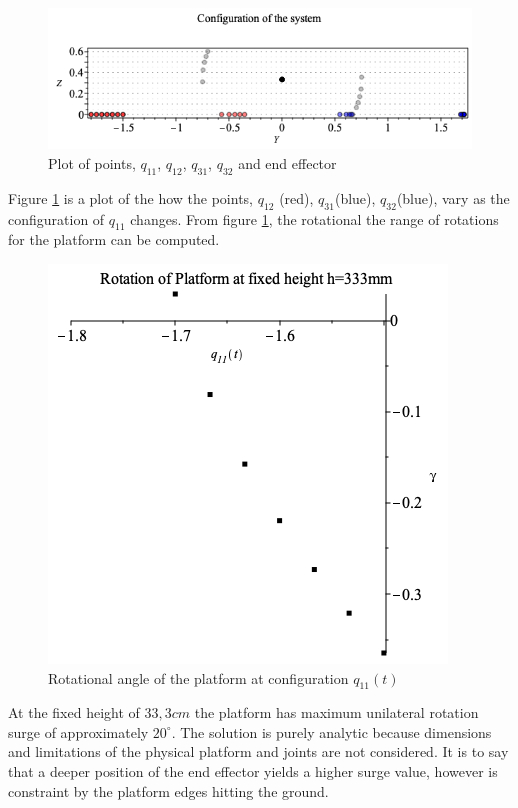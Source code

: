 \begin{figure}[h!]
  \centering
  \includegraphics[scale=0.6]{images/Surge_conf.png}
  \caption{Plot of points, $q_{11}$, $q_{12}$, $q_{31}$, $q_{32}$ and end effector
  \label{fig:q11Configurations}}
\end{figure}

Figure \ref{fig:q11Configurations} is a plot of the how the points, $q_{12}$ (red), $q_{31}$(blue), $q_{32}$(blue), vary as the configuration of $q_{11}$ changes. From figure \ref{fig:q11Configurations}, the rotational the range of rotations for the platform can be computed. 

\begin{figure}[h!]
  \centering
  \includegraphics[scale=0.5]{images/Surge.png}
  \caption{Rotational angle of the platform at configuration $q_{11}(t)$
  \label{fig:angle}}
\end{figure}

At the fixed height of $33,3cm$ the platform has maximum unilateral rotation surge of approximately $20^{\circ}$. The solution is purely analytic because dimensions and limitations of the physical platform and joints are not considered. It is to say that a deeper position of the end effector yields a higher surge value, however is constraint by the platform edges hitting the ground. 

